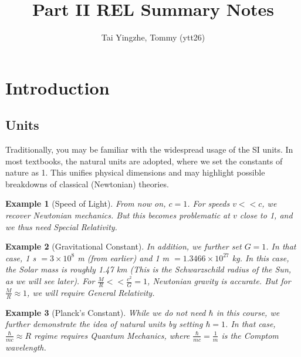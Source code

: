 \documentclass[a4paper]{article}
\title{\textbf{Part II REL Summary Notes}}
\author{Tai Yingzhe, Tommy (ytt26)}
\date{}
\newtheorem{eg}{Example}[section]
\theoremstyle{new}
\begin{document}
\maketitle
\tableofcontents

\newpage
\section{Introduction}
\subsection{Units}
Traditionally, you may be familiar with the widespread usage of the SI units. In most textbooks, the natural units are adopted, where we set the constants of nature as 1. This unifies physical dimensions and may highlight possible breakdowns of classical (Newtonian) theories. 
\begin{eg}[Speed of Light]
From now on, $c=1$. For speeds $v<<c$, we recover Newtonian mechanics. But this becomes problematic at $v$ close to 1, and we thus need Special Relativity.
\end{eg}
\begin{eg}[Gravitational Constant]
In addition, we further set $G=1$. In that case, 1 s $=3\times10^8$ m (from earlier) and 1 m $=1.3466\times10^{27}$ kg. In this case, the Solar mass is roughly 1.47 km (This is the Schwarzschild radius of the Sun, as we will see later). For $\frac{M}{R}<<\frac{c^2}{G}=1$, Newtonian gravity is accurate. But for $\frac{M}{R}\approx 1$, we will require General Relativity.
\end{eg}
\begin{eg}[Planck's Constant]
While we do not need $\hbar$ in this course, we further demonstrate the idea of natural units by setting $\hbar=1$. In that case, $\frac{\hbar}{mc}\approx R$ regime requires Quantum Mechanics, where $\frac{\hbar}{mc}=\frac{1}{m}$ is the Comptom wavelength.
\end{eg}
\end{document}
